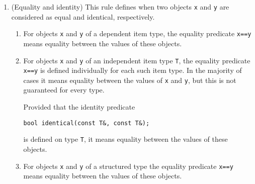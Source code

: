 \begin{enumerate}
\begin{enumerate}
      

	
\end{enumerate}
      


      \item 


          

 (Equality and identity) This rule defines when two
          objects \verb$x$ and \verb$y$ are
          considered as equal and identical, respectively.

          \begin{enumerate}
 



	  \item 
              

 For objects \verb$x$ and
              \verb$y$ of a dependent item type, the
              equality predicate \verb$x==y$ means
              equality between the values of these objects.

	  

	  \item 

              

 For objects \verb$x$ and
              \verb$y$ of an independent item type
              \verb$T$, the equality predicate
              \verb$x==y$ is defined individually for each
              such item type. In the majority of cases it means
              equality between the values of \verb$x$ and
              \verb$y$, but this is not guaranteed for
              every type.


              

 Provided that the identity predicate

\begin{verbatim}bool identical(const T&, const T&);
\end{verbatim}

is defined on type \verb$T$, it means equality between the values of these objects.
	  

          \item 
              

 For objects \verb$x$ and
              \verb$y$ of a structured type the equality
              predicate \verb$x==y$ means equality
              between the values of these objects.
          


	
\end{enumerate}
      




\end{enumerate}
